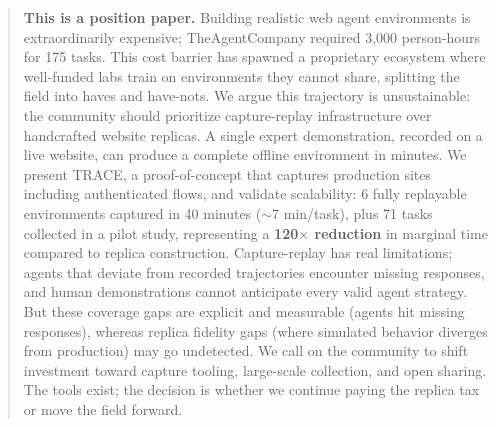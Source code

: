 \documentclass[letterpaper]{article}
\begin{document}
\raggedbottom
\sloppy


\printAffiliationsAndNotice{}


\begin{abstract}
\textbf{This is a position paper.} Building realistic web agent environments is extraordinarily expensive; TheAgentCompany required 3,000 person-hours for 175 tasks. This cost barrier has spawned a proprietary ecosystem where well-funded labs train on environments they cannot share, splitting the field into haves and have-nots. We argue this trajectory is unsustainable: the community should prioritize capture-replay infrastructure over handcrafted website replicas. A single expert demonstration, recorded on a live website, can produce a complete offline environment in minutes. We present TRACE, a proof-of-concept that captures production sites including authenticated flows, and validate scalability: 6 fully replayable environments captured in 40 minutes ($\sim$7 min/task), plus 71 tasks collected in a pilot study, representing a \textbf{120$\times$ reduction} in marginal time compared to replica construction. Capture-replay has real limitations; agents that deviate from recorded trajectories encounter missing responses, and human demonstrations cannot anticipate every valid agent strategy. But these coverage gaps are explicit and measurable (agents hit missing responses), whereas replica fidelity gaps (where simulated behavior diverges from production) may go undetected. We call on the community to shift investment toward capture tooling, large-scale collection, and open sharing. The tools exist; the decision is whether we continue paying the replica tax or move the field forward.
\end{abstract}
\end{document}
